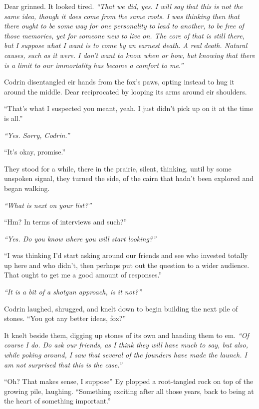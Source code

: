 Dear grinned. It looked tired. \emph{``That we did, yes. I will say that this is not the same idea, though it does come from the same roots. I was thinking then that there ought to be some way for one personality to lead to another, to be free of those memories, yet for someone new to live on. The core of that is still there, but I suppose what I want is to come by an earnest death. A real death. Natural causes, such as it were. I don't want to know when or how, but knowing that there is a limit to our immortality has become a comfort to me.''}

Codrin disentangled eir hands from the fox's paws, opting instead to hug it around the middle. Dear reciprocated by looping its arms around eir shoulders.

``That's what I suspected you meant, yeah. I just didn't pick up on it at the time is all.''

\emph{``Yes. Sorry, Codrin.''}

``It's okay, promise.''

They stood for a while, there in the prairie, silent, thinking, until by some unspoken signal, they turned the side, of the cairn that hadn't been explored and began walking.

\emph{``What is next on your list?''}

``Hm? In terms of interviews and such?''

\emph{``Yes. Do you know where you will start looking?''}

``I was thinking I'd start asking around our friends and see who invested totally up here and who didn't, then perhaps put out the question to a wider audience. That ought to get me a good amount of responses.''

\emph{``It is a bit of a shotgun approach, is it not?''}

Codrin laughed, shrugged, and knelt down to begin building the next pile of stones. ``You got any better ideas, fox?''

It knelt beside them, digging up stones of its own and handing them to em. \emph{``Of course I do. Do ask our friends, as I think they will have much to say, but also, while poking around, I saw that several of the founders have made the launch. I am not surprised that this is the case.''}

``Oh? That makes sense, I suppose'' Ey plopped a root-tangled rock on top of the growing pile, laughing. ``Something exciting after all those years, back to being at the heart of something important.''


